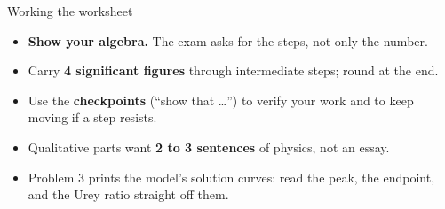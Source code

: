 \documentclass[aspectratio=169, 11pt]{beamer}
\begin{document}
\begin{frame}{Working the worksheet}
  \begin{itemize}
    \item \textbf{Show your algebra.} The exam asks for the steps, not only the number.
    \item Carry \textbf{4 significant figures} through intermediate steps; round at the end.
    \item Use the \textbf{checkpoints} (``show that \ldots'') to verify your work and to keep moving if a step resists.
    \item Qualitative parts want \textbf{2 to 3 sentences} of physics, not an essay.
    \item Problem 3 prints the model's solution curves: read the peak, the endpoint, and the Urey ratio straight off them.
  \end{itemize}
  \vskip8pt\relax
\end{frame}
\end{document}
